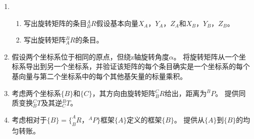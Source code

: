 \begin{enumerate}
\item 
	\begin{enumerate}
	 \item 写出旋转矩阵的条目$ ^ A_BR $假设基本向量$ X_A $，$ Y_A $，$ Z_A $和$ X_B $，$ Y_B $，$ Z_B $。
	 \item 写出旋转矩阵$ ^ B_AR $的条目。
	 \end{enumerate} 

\item 假设两个坐标系位于相同的原点，但绕z轴旋转角度$ \alpha $。 将旋转矩阵从一个坐标系导出到另一个坐标系，并验证该矩阵的每个条目确实是一个坐标系的每个基向量与第二个坐标系中的每个其他基矢量的标量乘积。
\item 考虑两个坐标系$ \{B \} $和$ \{C \} $，其方向由旋转矩阵$ ^C_BR $给出，距离为$ ^ BP $。 提供同质变换$ ^C_BT $及其逆$ ^B_CT $。
\item 考虑相对于$ \{B \} = \{^ A_BR，^ AP \} $框架$ \{A \} $定义的框架$ \{B \} $。 提供从$ \{A \} $到$ \{B \} $的均匀转账。
\end{enumerate}

